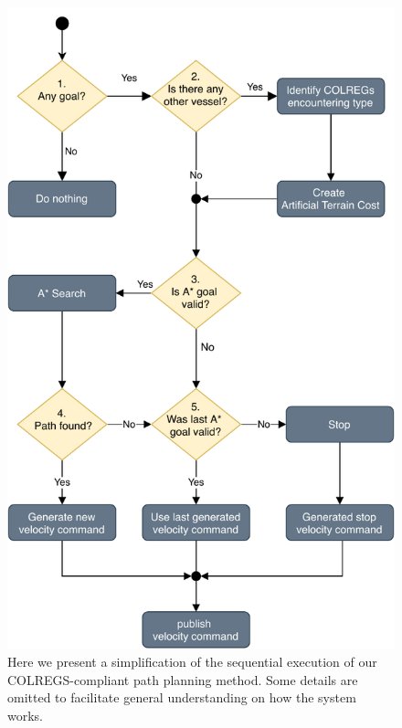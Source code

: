         \begin{figure}[H]
            \centering
            \includegraphics[scale=0.95]{figs/Chap4/local_planner_flow.pdf}
            \caption{Here we present a simplification of the sequential execution of our COLREGS-compliant path planning method. Some details are omitted to facilitate general understanding on how the system works.}
            \label{fig:local_planner_flow}
        \end{figure}